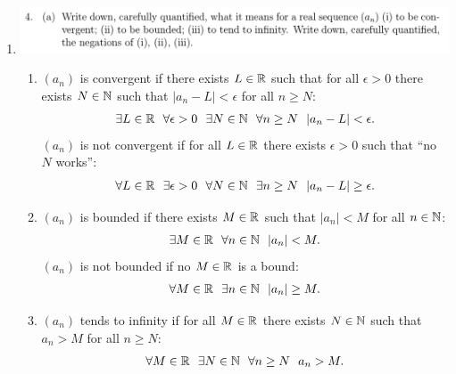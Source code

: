\documentclass[12pt]{article}
\begin{document}
\newpage
\subsection{}
\begin{enumerate}[label=(\alph*)]
\item\hspace{0pt}
  \begin{mdframed}
    \includegraphics[width=400pt]{img/oxford-M2-analysis-I-3-4-a.png}
  \end{mdframed}
  \begin{definition*}\hspace{0pt}
    \begin{enumerate}[label=(\roman*)]
    \item $(a_n)$ is convergent if there exists $L \in \mathbb{R}$ such that for all $\epsilon > 0$ there
      exists $N \in \mathbb{N}$ such that $|a_n - L| < \epsilon$ for all $n \geq N$:
      \begin{align*}
        \exists L \in \mathbb{R} ~~ \forall \epsilon > 0 ~~ \exists N \in \mathbb{N} ~~ \forall n \geq N ~~ |a_n - L| < \epsilon.
      \end{align*}
      $(a_n)$ is not convergent if for all $L \in \mathbb{R}$ there exists $\epsilon > 0$ such that ``no
      $N$ works'':
      \begin{align*}
        \forall L \in \mathbb{R} ~~ \exists \epsilon > 0 ~~ \forall N \in \mathbb{N} ~~ \exists n \geq N ~~ |a_n - L| \geq \epsilon.
      \end{align*}
    \item $(a_n)$ is bounded if there exists $M \in \mathbb{R}$ such that $|a_n| < M$ for all $n \in \mathbb{N}$:
      \begin{align*}
        \exists M \in \mathbb{R} ~~ \forall n \in \mathbb{N} ~~ |a_n| < M.
      \end{align*}
      $(a_n)$ is not bounded if no $M \in \mathbb{R}$ is a bound:
      \begin{align*}
        \forall M \in \mathbb{R} ~~ \exists n \in \mathbb{N} ~~ |a_n| \geq M.
      \end{align*}
    \item $(a_n)$ tends to infinity if for all $M \in \mathbb{R}$ there exists $N \in \mathbb{N}$ such that $a_n > M$ for
      all $n \geq N$:
      \begin{align*}
        \forall M \in \R ~~ \exists N \in \N ~~ \forall n \geq N ~~ a_n > M.

\end{align*}
\end{enumerate}
\end{definition*}
\end{enumerate}
\end{document}
